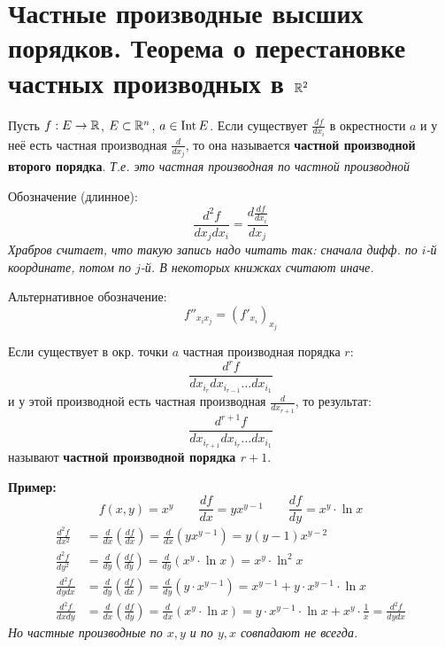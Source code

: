 \section{Частные производные высших порядков. Теорема о перестановке частных производных в $\mathbb{R}^2$}

\begin{conj}
    Пусть $f : E \to \mathbb{R}$, $E \subset \mathbb{R}^n$, $a \in \operatorname{Int} E$.
    Если существует $\frac{df}{d x_i}$ в окрестности $a$
    и у неё есть частная производная $\frac{d}{d x_j}$,
    то она называется \textbf{частной производной второго порядка}.
    \textit{Т.е. это частная производная по частной производной}

    Обозначение (длинное):
    $$\frac{d^2 f}{d x_j d x_i} = \frac{d \frac{d f}{d x_i}}{d x_j}$$
    \textit{Храбров считает, что такую запись надо читать так:
    сначала дифф. по $i$-й координате, потом по $j$-й. В некоторых
    книжках считают иначе.}

    Альтернативное обозначение:
    $$f''_{x_i x_j} = (f'_{x_i})_{x_j}$$
\end{conj}

\begin{conj}
    Если существует в окр. точки $a$ частная производная порядка $r$:
    $$ \frac{d^r f}{d x_{i_r} d x_{i_{r-1}} \dots d x_{i_1}} $$
    и у этой производной есть частная производная $\frac{d}{d x_{r+1}}$,
    то результат:
    $$ \frac{d^{r+1} f}{d x_{i_{r+1}} d x_{i_{r}} \dots d x_{i_1}} $$
    называют \textbf{частной производной порядка $r+1$}.
\end{conj}

\textbf{Пример:}
$$f(x, y) = x^y \quad\quad \frac{df}{dx} = y x^{y - 1} 
\quad\quad \frac{df}{dy} = x^y \cdot \ln x$$
\begin{align*}
    \frac{d^2 f}{d x^2} &= \frac{d}{dx} \left( \frac{df}{dx} \right)
    = \frac{d}{dx} \left( y x^{y - 1} \right) = y(y-1) x^{y-2} \\
    \frac{d^2 f}{d y^2} &= \frac{d}{dy} \left( \frac{df}{dy} \right)
    = \frac{d}{dy} \left( x^y \cdot \ln x \right) = x^y \cdot \ln^2 x \\
    \frac{d^2 f}{d y d x} &= \frac{d}{dy} \left( \frac{df}{dx} \right)
    = \frac{d}{dy} \left( y \cdot x^{y - 1} \right) = x^{y-1} + 
    y \cdot x^{y-1} \cdot \ln x \\
    \frac{d^2 f}{d x d y} &= \frac{d}{dx} \left( \frac{df}{dy} \right)
    = \frac{d}{dx} \left( x^y \cdot \ln x \right) =
    y \cdot x^{y - 1} \cdot \ln x + x^y \cdot \frac{1}{x} =
    \frac{d^2 f}{d y d x}
\end{align*}
\textit{Но частные производные по $x,y$ и по $y,x$ совпадают не всегда.}

